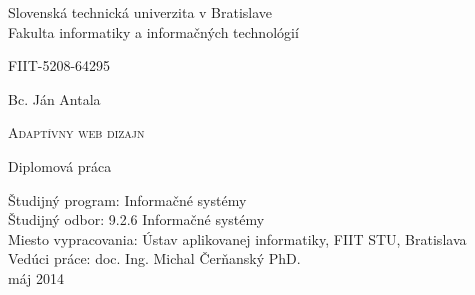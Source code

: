 

\setlength{\parindent}{0cm}

\thispagestyle{empty}

\begin{center}
\begin{LARGE}
\textmd{
Slovenská technická univerzita v Bratislave\\
\vspace*{0.2cm}
Fakulta informatiky a informačných technológií  
}
\end{LARGE}

\vspace*{1.0cm}
\begin{Large}
\textmd{FIIT-5208-64295}
\end{Large}

\end{center}

\vspace{5.5cm}

\begin{center}
{\Large \textmd{{Bc. Ján Antala}}}
\end{center}

\vspace{0.1cm}
\begin{huge}
\begin{center}
\textsc{Adaptívny web dizajn}
\end{center}
\end{huge}

\vspace{0.5cm}
\begin{center}
{\Large{\textmd{Diplomová práca}}}\\
\end{center}

\vspace{5.5cm}

\begin{flushleft}
\large{Študijný program: Informačné systémy} \\
\large{Študijný odbor: 9.2.6 Informačné systémy} \\
\large{Miesto vypracovania:  Ústav aplikovanej informatiky, FIIT STU, Bratislava} \\
\large{Vedúci práce: doc. Ing. Michal Čerňanský PhD.} \\
\vspace{1.0cm}
\large{máj 2014} \\
\end{flushleft}


